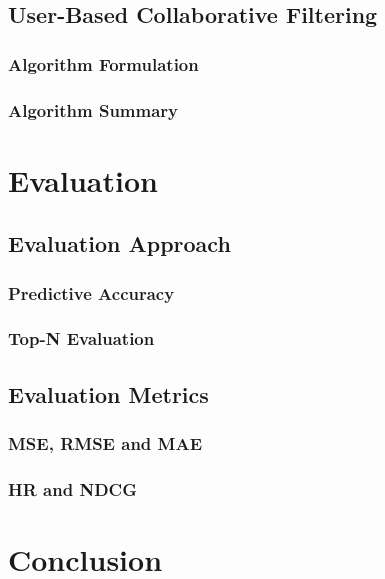 \subsection{User-Based Collaborative Filtering}
\label{subsec:User-Based Collaborative Filtering}


\subsubsection{Algorithm Formulation}
\label{subsubsec:Algorithm Formulation}


\subsubsection{Algorithm Summary}
\label{subsubsec:Algorithm Summary}

\section{Evaluation}
\label{sec:Evaluation}


\subsection{Evaluation Approach}
\label{subsec:Evaluation Approach}


\subsubsection{Predictive Accuracy}
\label{subsubsec:Predictive Accuracy}


\subsubsection{Top-N Evaluation}
\label{subsubsec:Top-N Evaluation}


\subsection{Evaluation Metrics}
\label{subsec:Evaluation Metrics}

\subsubsection{MSE, RMSE and MAE}
\label{subsubsec:MSE, RMSE and MAE}


\subsubsection{HR and NDCG}
\label{subsubsec:HR and NDCG}


\section{Conclusion}
\label{sec:Conclusion for Methodology}
